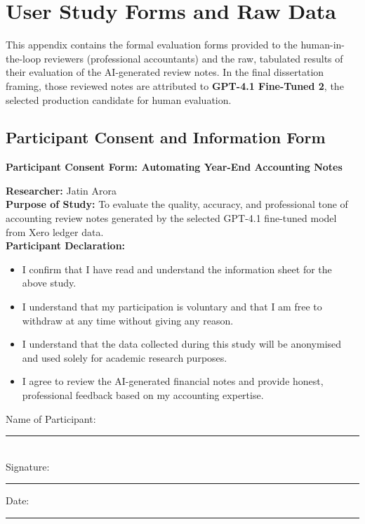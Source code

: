 \chapter{User Study Forms and Raw Data}
\label{app:user_study}

This appendix contains the formal evaluation forms provided to the human-in-the-loop reviewers (professional accountants) and the raw, tabulated results of their evaluation of the AI-generated review notes. In the final dissertation framing, those reviewed notes are attributed to \textbf{GPT-4.1 Fine-Tuned 2}, the selected production candidate for human evaluation.

\section{Participant Consent and Information Form}
\label{app:sec:consent_form}

\begin{center}
\textbf{Participant Consent Form: Automating Year-End Accounting Notes}
\end{center}

\textbf{Researcher:} Jatin Arora \\
\textbf{Purpose of Study:} To evaluate the quality, accuracy, and professional tone of accounting review notes generated by the selected GPT-4.1 fine-tuned model from Xero ledger data. \\

\textbf{Participant Declaration:}
\begin{itemize}
    \item I confirm that I have read and understand the information sheet for the above study.
    \item I understand that my participation is voluntary and that I am free to withdraw at any time without giving any reason.
    \item I understand that the data collected during this study will be anonymised and used solely for academic research purposes.
    \item I agree to review the AI-generated financial notes and provide honest, professional feedback based on my accounting expertise.
\end{itemize}

\vspace{1cm}
Name of Participant: \rule{6cm}{0.4pt} \\
\vspace{0.5cm}
Signature: \rule{6cm}{0.4pt} \hspace{1cm} Date: \rule{4cm}{0.4pt}

